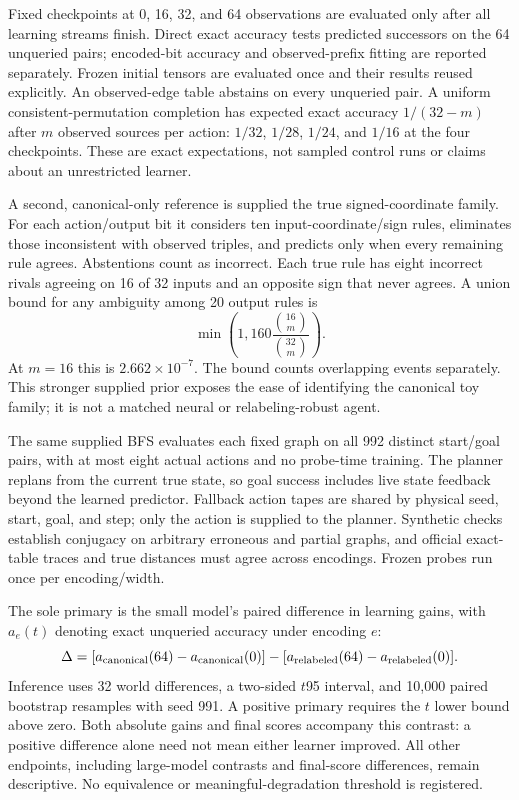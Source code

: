 \documentclass[11pt]{article}
\begin{document}
Fixed checkpoints at 0, 16, 32, and 64 observations are evaluated only after
all learning streams finish. Direct exact accuracy tests predicted successors
on the 64 unqueried pairs; encoded-bit accuracy and observed-prefix fitting
are reported separately. Frozen initial tensors are evaluated once and their
results reused explicitly. An observed-edge table abstains on every unqueried
pair. A uniform consistent-permutation completion has expected exact accuracy
$1/(32-m)$ after $m$ observed sources per action: $1/32$, $1/28$, $1/24$, and
$1/16$ at the four checkpoints. These are exact expectations, not sampled
control runs or claims about an unrestricted learner.

A second, canonical-only reference is supplied the true signed-coordinate
family. For each action/output bit it considers ten input-coordinate/sign
rules, eliminates those inconsistent with observed triples, and predicts only
when every remaining rule agrees. Abstentions count as incorrect. Each true
rule has eight incorrect rivals agreeing on 16 of 32 inputs and an opposite
sign that never agrees. A union bound for any ambiguity among 20 output rules
is
\[
 \min\left(1,160\frac{\binom{16}{m}}{\binom{32}{m}}\right).
\]
At $m=16$ this is $2.662\times10^{-7}$. The bound counts overlapping events
separately. This stronger supplied prior exposes the ease of identifying the
canonical toy family; it is not a matched neural or relabeling-robust agent.

The same supplied BFS evaluates each fixed graph on all 992 distinct
start/goal pairs, with at most eight actual actions and no probe-time training.
The planner replans from the current true state, so goal success includes
live state feedback beyond the learned predictor. Fallback action tapes are
shared by physical seed, start, goal, and step; only the action is supplied
to the planner. Synthetic checks establish conjugacy on arbitrary erroneous
and partial graphs, and official exact-table traces and true distances must
agree across encodings. Frozen probes run once per encoding/width.

The sole primary is the small model's paired difference in learning gains,
with $a_e(t)$ denoting exact unqueried accuracy under encoding $e$:
\[
 \Delta=[a_{\rm canonical}(64)-a_{\rm canonical}(0)]
       -[a_{\rm relabeled}(64)-a_{\rm relabeled}(0)].
\]
Inference uses 32 world differences, a two-sided $t$95 interval, and 10,000
paired bootstrap resamples with seed 991. A positive primary requires the
$t$ lower bound above zero. Both absolute gains and final scores accompany
this contrast: a positive difference alone need not mean either learner
improved. All other endpoints, including large-model contrasts and final-score
differences, remain descriptive. No equivalence or meaningful-degradation
threshold is registered.
\end{document}
